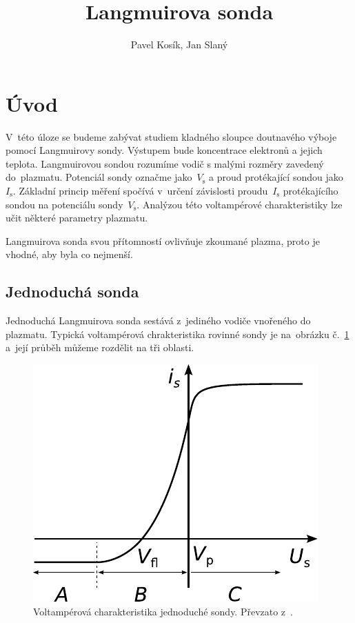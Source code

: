 \documentclass{protokol}
\title{Langmuirova sonda}
\author{Pavel Kosík, Jan Slaný}
\newcommand\iprobe{I_\mathrm{s}}
\newcommand\potprobe{V_\mathrm{s}}
\begin{document}
\header

\newcommand\parta{A}
\newcommand\partb{B}
\newcommand\partc{C}
\newcommand\probesurf{S}
\newcommand\tempelec{T_\mathrm{e}}
\section{Úvod}
V~této úloze se budeme zabývat studiem kladného sloupce doutnavého výboje
pomocí Langmuirovy sondy.
Výstupem bude koncentrace elektronů a jejich teplota.
Langmuirovou sondou rozumíme vodič s malými rozměry zavedený do~plazmatu.
Potenciál sondy označme jako~$\potprobe$ a proud protékající sondou
jako~$\iprobe$.
Základní princip měření spočívá v~určení závislosti proudu~$\iprobe$
protékajícího sondou na potenciálu sondy~$\potprobe$.
Analýzou této voltampérové charakteristiky lze učit některé parametry plazmatu.

Langmuirova sonda svou přítomností ovlivňuje zkoumané plazma,
proto je vhodné, aby byla co nejmenší.

\subsection{Jednoduchá sonda}
Jednoduchá Langmuirova sonda sestává z~jediného vodiče vnořeného do plazmatu.
Typická voltampérová chrakteristika rovinné sondy je na~obrázku
č.~\ref{fig:vac-simple} a~její průběh můžeme rozdělit na tři oblasti.

\begin{figure}[hbp]
	\centering
	\includegraphics{vac-simple}
	\caption{Voltampérová charakteristika jednoduché sondy.
		Převzato z~\autocite{assignment-simpleprobe}.}
	\label{fig:vac-simple}
\end{figure}
\end{document}
